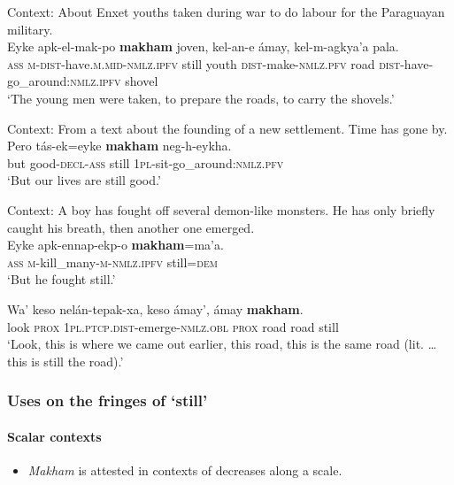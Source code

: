 \begin{exe}
	\ex\label{exAppendixEnxetSur1}
	Context: About Enxet youths taken during war to do labour for the Paraguayan military.\\
	\gll Eyke apk-el-mak-po \textbf{makham} joven, kel-an-e ámay, kel-m-agkya’a pala.\\
	\textsc{ass} \textsc{m}-\textsc{dist}-have.\textsc{m}.\textsc{mid}-\textsc{nmlz}.\textsc{ipfv} still youth \textsc{dist}-make-\textsc{nmlz}.\textsc{pfv} road \textsc{dist}-have-go\_around:\textsc{nmlz}.\textsc{ipfv} shovel\\
	\glt \lq The young men were taken, to prepare the roads, to carry the shovels.' \parencite[525]{Elliot2021}
	
	\ex
	Context: From a text about the founding of a new settlement. Time has gone by.\\
	\gll Pero tás-ek=eyke \textbf{makham} neg-h-eykha.\\
	but good-\textsc{decl}-\textsc{ass} still 1\textsc{pl}-sit-go\_around:\textsc{nmlz}.\textsc{pfv}\\
	\glt \lq But our lives are still good.' \parencite[771]{Elliot2021}

	\ex\label{exAppendixEnxetSur3}
	Context: A boy has fought off several demon-like monsters. He has only briefly caught his breath, then another one emerged.\\
	\gll Eyke apk-ennap-ekp-o \textbf{makham}=ma’a.\\
	\textsc{ass} \textsc{m}-kill\_many-\textsc{m}-\textsc{nmlz}.\textsc{ipfv} still=\textsc{dem}\\
	\glt \lq But he fought still.' \parencite[759]{Elliot2021}
	
	\ex\label{exAppendixEnxetSur4}
	\gll Wa’ keso nelán-tepak-xa, keso ámay’, ámay \textbf{makham}.\\
	look \textsc{prox} 1\textsc{pl}.\textsc{ptcp}.\textsc{dist}-emerge-\textsc{nmlz}.\textsc{obl} \textsc{prox} road road still\\
	\glt \lq Look, this is where we came out earlier, this road, this is the same road (lit. …this is still the road).\rq{ }\parencite[266]{Elliot2021}
\end{exe}

\subsubsection{Uses on the fringes of \lq{}still\rq{}}

\paragraph{Scalar contexts}\label{appendixEnxetSurScalar}
\begin{itemize}
	\item \textit{Makham} is attested in contexts of decreases along a scale.
\end{itemize}

